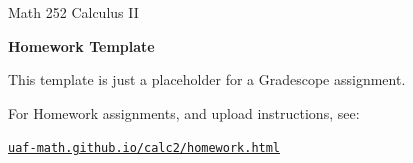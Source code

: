 \documentclass[12pt]{amsart}
\begin{document}
\scriptsize \noindent Math 252 Calculus II
\normalsize\medskip

\Large\centerline{\textbf{Homework Template}}
\large
\bigskip \bigskip

\normalsize
This template is just a placeholder for a Gradescope assignment.

\bigskip
For Homework assignments, and upload instructions, see:

\begin{center}
\Large
\href{https://uaf-math.github.io/calc2/homework.html}{\texttt{uaf-math.github.io/calc2/homework.html}}
\end{center}
\end{document}
